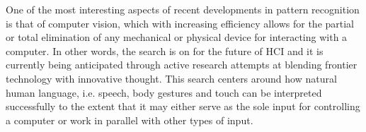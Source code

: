 \begin{comment}
Yet, the field of interaction has been at a standstill for many years, with keyboard and mice dominating the desktop\fn{Alternatives (such as trackballs, touch-pads, electronic pens etc.) exist, although haven't gained widespread use and are all limited to interactions in two dimensions only. }.  Recent technological advancements have however managed to bridge the gap between the shortcomings of the past and an array of new ideas for what the future may hold within the field of interaction. One of the major foundations of this new progress is \ti{computer vision}, which may appropriately be described as the result of a cataclysm between existing research and broad gains in computational power, especially on consumer-level. More precisely, the ability of an algorithm to recognize and categorize visual cues, such as physical shapes or human gestures, relies heavily on searching a hypothesis space that scales far beyond what is computationally feasible, given narrow time constraints. For instance, the task of locating a hand within an image with reasonable certainty will typically rely on a mix of algorithms, of which one candidate may very well be \ti{support vector machines}\cite{Bishop} (SVMs). For the example of SVMs, these have been around for more than 50 years, but have gained immense popularity in recent years, due to their ability of efficiently performing classification and regression in very high dimensional spaces\fn{I.e. when employed with \ti{kernel methods}\cite{Bishop}.}. Hence, computer vision and pattern recognition is in fact a well-established research tradition, but with newfound applicability due to the rise of big data\fn{A broad term coined in 1997\cite{BigData}, here to be understood as extremely large data sets that may be analysed computationally to reveal patterns, trends, and associations, especially relating to human behaviour and interactions.} and increased availability of computational power.

############################################################# 
\end{comment}  

One of the most interesting aspects of recent developments in pattern recognition is that of computer vision, which with increasing efficiency allows for the partial or total elimination of any mechanical or physical device for interacting with a computer. In other words, the search is on for the future of HCI and it is currently being anticipated through active research attempts at blending frontier technology with innovative thought. This search centers around how natural human language, i.e. speech, body gestures and touch can be interpreted successfully to the extent that it may either serve as the sole input for controlling a computer or work in parallel with other types of input.

